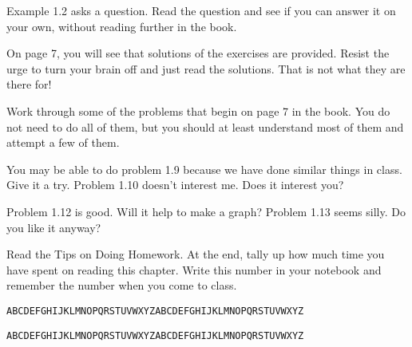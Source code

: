 Example 1.2 asks a question.  Read the question and see if you can answer it on your own, without reading further in the book.

On page 7, you will see that solutions of the exercises are provided.
Resist the urge to turn your brain off and just read the solutions.  That is not what they are there for!

Work through some of the problems that begin on page 7 in the book.
You do not need to do all of them, but you should at least understand most of them and attempt a few of them.

You may be able to do problem 1.9 because we have done similar things in class.
Give it a try.
Problem 1.10 doesn't interest me.  Does it interest you?

Problem 1.12 is good.  Will it help to make a graph?
Problem 1.13 seems silly.  Do you like it anyway?

Read the Tips on Doing Homework.
At the end, tally up how much time you have spent on reading this chapter.
Write this number in your notebook and remember the number when you come to class.

\vfill          %

{\tt ABCDEFGHIJKLMNOPQRSTUVWXYZABCDEFGHIJKLMNOPQRSTUVWXYZ}

\vspace{0.1in}

{\tt ABCDEFGHIJKLMNOPQRSTUVWXYZABCDEFGHIJKLMNOPQRSTUVWXYZ}

